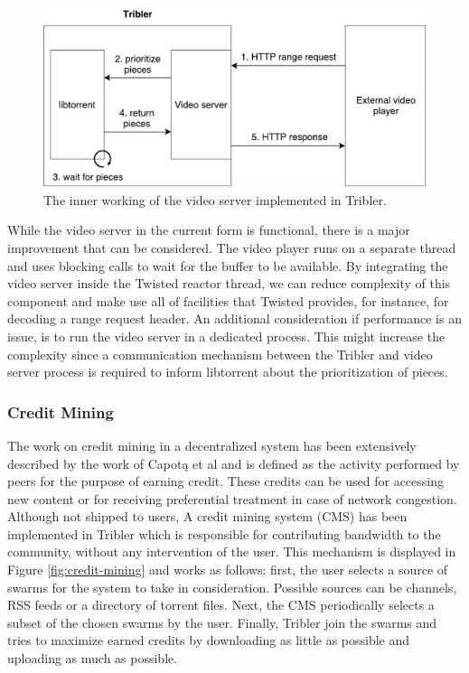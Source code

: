 \begin{figure}[h!]
	\centering
	\includegraphics[width=0.7\columnwidth]{images/architecture/video_server}
	\caption{The inner working of the video server implemented in Tribler.}
	\label{fig:video-server}
\end{figure}

While the video server in the current form is functional, there is a major improvement that can be considered. The video player runs on a separate thread and uses blocking calls to wait for the buffer to be available. By integrating the video server inside the Twisted reactor thread, we can reduce complexity of this component and make use all of facilities that Twisted provides, for instance, for decoding a range request header. An additional consideration if performance is an issue, is to run the video server in a dedicated process. This might increase the complexity since a communication mechanism between the Tribler and video server process is required to inform libtorrent about the prioritization of pieces.

\subsubsection{\textbf{Credit Mining}}
The work on credit mining in a decentralized system has been extensively described by the work of Capot\k{a} et al\cite{capotka2015decentralized} and is defined as the activity performed by peers for the purpose of earning credit. These credits can be used for accessing new content or for receiving preferential treatment in case of network congestion. Although not shipped to users, A credit mining system (CMS) has been implemented in Tribler which is responsible for contributing bandwidth to the community, without any intervention of the user. This mechanism is displayed in Figure \ref{fig:credit-mining} and works as follows: first, the user selects a source of swarms for the system to take in consideration. Possible sources can be channels, RSS feeds or a directory of torrent files. Next, the CMS periodically selects a subset of the chosen swarms by the user. Finally, Tribler join the swarms and tries to maximize earned credits by downloading as little as possible and uploading as much as possible.\\

